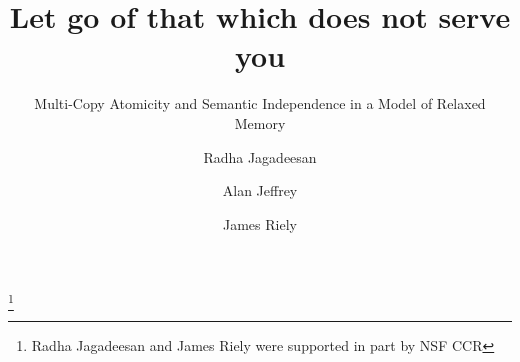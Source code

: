 \documentclass[sigplan,10pt,
review,anonymous,
]{acmart}
\theoremstyle{acmdefinition}
\begin{document}
\title{Let go of that which does not serve you}
\subtitle{Multi-Copy Atomicity and Semantic Independence in a Model of Relaxed Memory}





\author{Radha Jagadeesan}

\author{Alan Jeffrey}

\author{James Riely}


\thanks{Radha Jagadeesan and James Riely were supported in part by NSF CCR}
\end{document}
